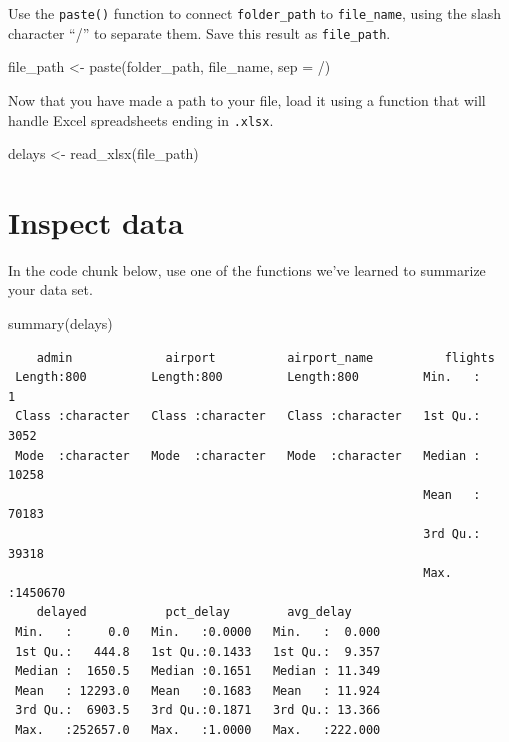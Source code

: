 \documentclass[
  letterpaper,
  DIV=11,
  numbers=noendperiod]{scrartcl}
\newenvironment{Shaded}{\begin{snugshade}}{\end{snugshade}}
\newcommand{\AttributeTok}[1]{\textcolor[rgb]{0.40,0.45,0.13}{#1}}
\newcommand{\FunctionTok}[1]{\textcolor[rgb]{0.28,0.35,0.67}{#1}}
\newcommand{\NormalTok}[1]{\textcolor[rgb]{0.00,0.23,0.31}{#1}}
\newcommand{\OtherTok}[1]{\textcolor[rgb]{0.00,0.23,0.31}{#1}}
\newcommand{\StringTok}[1]{\textcolor[rgb]{0.13,0.47,0.30}{#1}}
\begin{document}
Use the \texttt{paste()} function to connect \texttt{folder\_path} to
\texttt{file\_name}, using the slash character ``/'' to separate them.
Save this result as \texttt{file\_path}.

\begin{Shaded}
\begin{Highlighting}[]
\NormalTok{file\_path }\OtherTok{\textless{}{-}} \FunctionTok{paste}\NormalTok{(folder\_path, }
\NormalTok{                   file\_name, }
                   \AttributeTok{sep =} \StringTok{\textquotesingle{}/\textquotesingle{}}\NormalTok{)}
\end{Highlighting}
\end{Shaded}

Now that you have made a path to your file, load it using a function
that will handle Excel spreadsheets ending in \texttt{.xlsx}.

\begin{Shaded}
\begin{Highlighting}[]
\NormalTok{delays }\OtherTok{\textless{}{-}} \FunctionTok{read\_xlsx}\NormalTok{(file\_path)}
\end{Highlighting}
\end{Shaded}

\section{Inspect data}\label{inspect-data}

In the code chunk below, use one of the functions we've learned to
summarize your data set.

\begin{Shaded}
\begin{Highlighting}[]
\FunctionTok{summary}\NormalTok{(delays)}
\end{Highlighting}
\end{Shaded}

\begin{verbatim}
    admin             airport          airport_name          flights       
 Length:800         Length:800         Length:800         Min.   :      1  
 Class :character   Class :character   Class :character   1st Qu.:   3052  
 Mode  :character   Mode  :character   Mode  :character   Median :  10258  
                                                          Mean   :  70183  
                                                          3rd Qu.:  39318  
                                                          Max.   :1450670  
    delayed           pct_delay        avg_delay      
 Min.   :     0.0   Min.   :0.0000   Min.   :  0.000  
 1st Qu.:   444.8   1st Qu.:0.1433   1st Qu.:  9.357  
 Median :  1650.5   Median :0.1651   Median : 11.349  
 Mean   : 12293.0   Mean   :0.1683   Mean   : 11.924  
 3rd Qu.:  6903.5   3rd Qu.:0.1871   3rd Qu.: 13.366  
 Max.   :252657.0   Max.   :1.0000   Max.   :222.000  
\end{verbatim}
\end{document}
